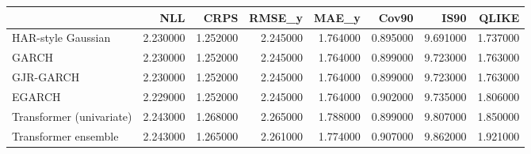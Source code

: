 \begin{tabular}{lrrrrrrr}
\toprule
 & NLL & CRPS & RMSE_y & MAE_y & Cov90 & IS90 & QLIKE \\
\midrule
HAR-style Gaussian & 2.230000 & 1.252000 & 2.245000 & 1.764000 & 0.895000 & 9.691000 & 1.737000 \\
GARCH & 2.230000 & 1.252000 & 2.245000 & 1.764000 & 0.899000 & 9.723000 & 1.763000 \\
GJR-GARCH & 2.230000 & 1.252000 & 2.245000 & 1.764000 & 0.899000 & 9.723000 & 1.763000 \\
EGARCH & 2.229000 & 1.252000 & 2.245000 & 1.764000 & 0.902000 & 9.735000 & 1.806000 \\
Transformer (univariate) & 2.243000 & 1.268000 & 2.265000 & 1.788000 & 0.899000 & 9.807000 & 1.850000 \\
Transformer ensemble & 2.243000 & 1.265000 & 2.261000 & 1.774000 & 0.907000 & 9.862000 & 1.921000 \\
\bottomrule
\end{tabular}
